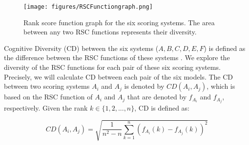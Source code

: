 
\begin{figure}[h!]
	\centering
	\texttt{[image: figures/RSCFunctiongraph.png]}
	\caption{Rank score function graph for the six scoring systems. The area between any two RSC functions represents their diversity.}
	\label{fig:rsc_div_plot}
\end{figure}

Cognitive Diversity (CD) between the six systems (${A,B,C,D,E,F}$) is defined as the difference between the RSC functions of these systems \cite{hsu2019cognitive}. We explore the diversity of the RSC functions for each pair of these six scoring systems. Precisely, we will calculate CD between each pair of the six models. The CD between two scoring systems $A_i$ and $A_j$ is denoted by $CD(A_i,A_j)$, which is based on the RSC function of $A_i$ and $A_j$ that are denoted by $f_{A_i}$ and $f_{A_j}$, respectively. Given the rank $k \in \{1, 2, ..., n\}$, CD is defined as:

\begin{equation}
CD(A_i,A_j) = \sqrt{ \frac{1}{n^2-n} \sum_{k=1}^n{(f_{A_i}(k) - f_{A_j}(k))^2}}
\end{equation}

